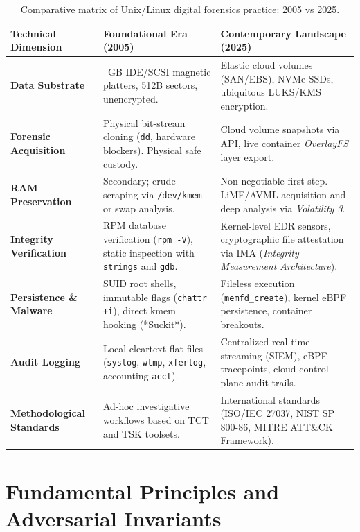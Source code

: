 \begin{table}[htbp]
\centering
\scriptsize
\begin{tabularx}{\textwidth}{@{} l >{\raggedright\arraybackslash}X >{\raggedright\arraybackslash}X @{}}
\toprule
\textbf{Technical Dimension} & \textbf{Foundational Era (2005)} & \textbf{Contemporary Landscape (2025)} \\
\midrule
\textbf{Data Substrate} & 20~GB IDE/SCSI magnetic platters, 512B sectors, unencrypted. & Elastic cloud volumes (SAN/EBS), NVMe SSDs, ubiquitous LUKS/KMS encryption. \\
\addlinespace
\textbf{Forensic Acquisition} & Physical bit-stream cloning (\texttt{dd}, hardware blockers). Physical safe custody. & Cloud volume snapshots via API, live container \textit{OverlayFS} layer export. \\
\addlinespace
\textbf{RAM Preservation} & Secondary; crude scraping via \texttt{/dev/kmem} or swap analysis. & Non-negotiable first step. LiME/AVML acquisition and deep analysis via \textit{Volatility 3}. \\
\addlinespace
\textbf{Integrity Verification} & RPM database verification (\texttt{rpm -V}), static inspection with \texttt{strings} and \texttt{gdb}. & Kernel-level EDR sensors, cryptographic file attestation via IMA (\textit{Integrity Measurement Architecture}). \\
\addlinespace
\textbf{Persistence \& Malware} & SUID root shells, immutable flags (\texttt{chattr +i}), direct kmem hooking (*Suckit*). & Fileless execution (\texttt{memfd\_create}), kernel eBPF persistence, container breakouts. \\
\addlinespace
\textbf{Audit Logging} & Local cleartext flat files (\texttt{syslog}, \texttt{wtmp}, \texttt{xferlog}, accounting \texttt{acct}). & Centralized real-time streaming (SIEM), eBPF tracepoints, cloud control-plane audit trails. \\
\addlinespace
\textbf{Methodological Standards} & Ad-hoc investigative workflows based on TCT and TSK toolsets. & International standards (ISO/IEC 27037, NIST SP 800-86, MITRE ATT\&CK Framework). \\
\bottomrule
\end{tabularx}
\caption{Comparative matrix of Unix/Linux digital forensics practice: 2005 vs 2025.}
\label{tab:evolucion_forense_2005_2025}
\end{table}

\section{Fundamental Principles and Adversarial Invariants}

